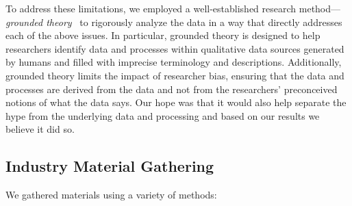To address these limitations, we employed a well-established research method---\emph{grounded theory}~\cite{corbin1990grounded,wolfswinkel2013using} to rigorously analyze the data in a way that directly addresses each of the above issues.
In particular, grounded theory is designed to help researchers identify data and processes within qualitative data sources generated by humans and filled with imprecise terminology and descriptions.
Additionally, grounded theory limits the impact of researcher bias, ensuring that the data and processes are derived from the data and not from the researchers' preconceived notions of what the data says.
Our hope was that it would also help separate the hype from the underlying data and processing and based on our results we believe it did so.




\subsection{Industry Material Gathering}
We gathered materials using a variety of methods:

